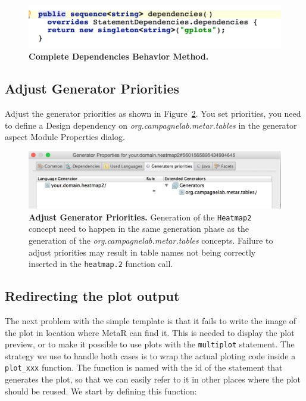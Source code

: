\begin{figure}
  \centering
  \includegraphics[width=\figWidthSmall]{figures/dependenciesMethodComplete.png}
\caption[Complete Dependencies Behavior Method.]{\textbf{Complete Dependencies Behavior Method.}}
\label{fig:dependenciesMethodComplete}
\end{figure}

\subsection{Adjust Generator Priorities}
Adjust the generator priorities as shown in Figure~\ref{fig:Generator_Properties_your_domain_heatmap2}. You set priorities, you need to define a Design dependency on \textit{org.campagnelab.metar.tables} in the generator aspect Module Properties dialog. 

\begin{figure}[h!tbp]
  \centering
  \includegraphics[width=\figWidthWide]{figures/Generator_Properties_your_domain_heatmap2.png}
\caption[Adjust Generator Priorities.]{\textbf{Adjust Generator Priorities.} Generation of the \texttt{Heatmap2} concept need to happen in the same generation phase as the generation of the  \textit{org.campagnelab.metar.tables} concepts. Failure to adjust priorities may result in table names not being correctly inserted in the \texttt{heatmap.2} function call.}
\label{fig:Generator_Properties_your_domain_heatmap2}
\end{figure}

\subsection{Redirecting the plot output}
The next problem with the simple template is that it fails to write the image of the plot in  location where MetaR can find it. This is needed to display the plot preview, or to make it possible to use plots with the \texttt{multiplot} statement.
The strategy we use to handle both cases is to wrap the actual ploting code inside a \texttt{plot\_xxx} function. The function is named with the id of the statement that generates the plot, so that we can easily refer to it in other places where the plot should be reused. We start by defining this function:

